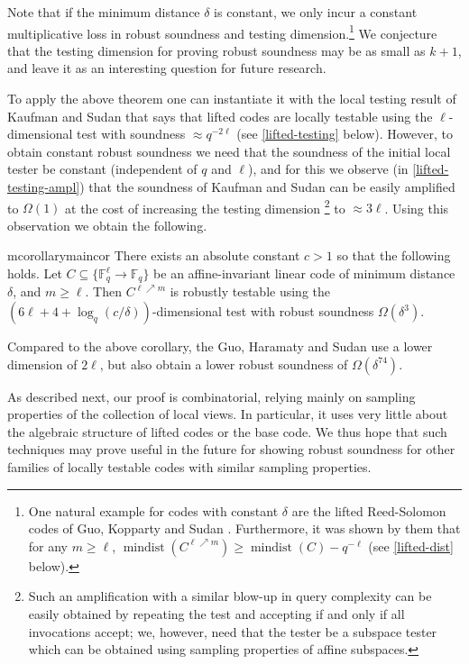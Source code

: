 \documentclass[11pt]{article}
\numberwithin{equation}{section}
\theoremstyle{definition}
\theoremstyle{plain}
\theoremstyle{plain}
\DeclareMathOperator{\mindist}{mindist}  %
\newcommand{\F}{{\mathbb{F}}}
\newcommand{\Func}[1]{\{\F_q^{#1} \to \F_q\}}
\begin{document}
  
Note that if the %
minimum  %
distance $\delta$ is constant, we only incur a constant multiplicative loss in robust soundness and testing dimension.\footnote{One natural example for codes with constant $\delta$ are the lifted Reed-Solomon codes of Guo, Kopparty and Sudan \cite{GuoKS2013}. Furthermore, it was shown by them \cite{GuoKS2013} that for any $m \geq \ell$, $\mindist(C^{\ell \nearrow m})\geq\mindist(C)-q^{-\ell}$ (see \cref{lifted-dist} below).} We conjecture that the testing dimension for proving robust soundness may be as small as $k+1$, and leave it as an interesting question for future research.

To apply the above theorem one can instantiate it with the local testing result of Kaufman and Sudan \cite{KaufmanS2008}  that says that lifted codes are locally testable using the $\ell$-dimensional test with soundness $\approx q^{-2\ell}$ (see \cref{lifted-testing} below).
However, to obtain constant robust soundness we need that the soundness 
of the initial local tester
%
be constant (independent of $q$ and $\ell$), and for this we observe (in \cref{lifted-testing-ampl}) that the soundness of Kaufman and Sudan \cite{KaufmanS2008} can be easily amplified to $\Omega(1)$ at the cost of increasing the testing dimension%
%
%
\footnote{Such an amplification with
a  %
similar blow-up in query complexity can be easily obtained by repeating the test and accepting if and only if all invocations accept; we,
 however,  %
 need that the tester %
 be a subspace tester which can be obtained using sampling properties of affine subspaces.}   
to $\approx 3\ell$. %
Using this observation we obtain the following.

\begin{restatable}{mcorollary}{maincor}\label{cor:main}
%
There exists an absolute constant $c>1$ so that the following holds.
Let $C \subseteq \Func{\ell}$ be an affine-invariant linear  code of
%
minimum   %
distance $\delta$, and $m \geq \ell$. Then $C^{\ell \nearrow
  m}$ is robustly testable using the
$(6\ell+4+\log_q(c/\delta))$-dimensional test  with robust soundness
$\Omega( \delta^3)$.
%
\end{restatable}


Compared to the above corollary, the %
Guo, Haramaty and Sudan \cite{GuoHS2015} %
use  %
a lower dimension of $2\ell$, but also obtain a 
lower robust soundness of $\Omega(\delta^{74})$.

As described next, our proof is combinatorial, relying mainly on sampling properties of the collection of local views. In particular, it uses very little about the algebraic structure of lifted codes or the base code.
We thus hope that such techniques %
may  %
prove useful in the future for showing robust soundness for 
other families of locally testable codes with similar sampling properties.
\end{document}
